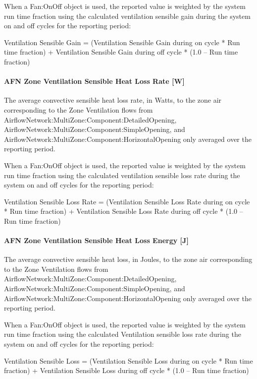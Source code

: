 When a Fan:OnOff object is used, the reported value is weighted by the system run time fraction using the calculated ventilation sensible gain during the system on and off cycles for the reporting period:

Ventilation Sensible Gain = (Ventilation Sensible Gain during on cycle * Run time fraction) + Ventilation Sensible Gain during off cycle * (1.0 -- Run time fraction)

\paragraph{AFN Zone Ventilation Sensible Heat Loss Rate {[}W{]}}\label{afn-zone-ventilation-sensible-heat-loss-rate-w}

The average convective sensible heat loss rate, in Watts, to the zone air corresponding to the Zone Ventilation flows from AirflowNetwork:MultiZone:Component:DetailedOpening, AirflowNetwork:MultiZone:Component:SimpleOpening, and AirflowNetwork:MultiZone:Component:HorizontalOpening only averaged over the reporting period.

When a Fan:OnOff object is used, the reported value is weighted by the system run time fraction using the calculated ventilation sensible loss rate during the system on and off cycles for the reporting period:

Ventilation Sensible Loss Rate = (Ventilation Sensible Loss Rate during on cycle * Run time fraction) + Ventilation Sensible Loss Rate during off cycle * (1.0 -- Run time fraction)

\paragraph{AFN Zone Ventilation Sensible Heat Loss Energy {[}J{]}}\label{afn-zone-ventilation-sensible-heat-loss-energy-j}

The average convective sensible heat loss, in Joules, to the zone air corresponding to the Zone Ventilation flows from AirflowNetwork:MultiZone:Component:DetailedOpening, AirflowNetwork:MultiZone:Component:SimpleOpening, and AirflowNetwork:MultiZone:Component:HorizontalOpening only averaged over the reporting period.

When a Fan:OnOff object is used, the reported value is weighted by the system run time fraction using the calculated Ventilation sensible loss rate during the system on and off cycles for the reporting period:

Ventilation Sensible Loss = (Ventilation Sensible Loss during on cycle * Run time fraction) + Ventilation Sensible Loss during off cycle * (1.0 -- Run time fraction)

